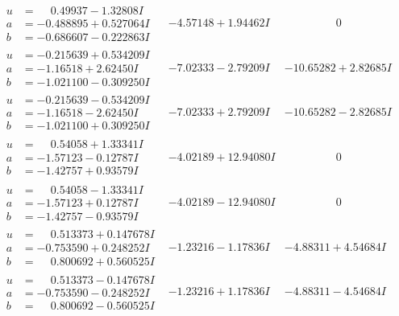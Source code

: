 \documentclass[1p]{elsarticle_modified}
\theoremstyle{definition}
\begin{document}
$$\begin{array}{c|c|c}
\begin{aligned}
u &= \phantom{-}0.49937 - 1.32808 I \\
a &= -0.488895 + 0.527064 I \\
b &= -0.686607 - 0.222863 I\end{aligned}
 & -4.57148 + 1.94462 I & \phantom{-0.000000 } 0 \\ \hline\begin{aligned}
u &= -0.215639 + 0.534209 I \\
a &= -1.16518 + 2.62450 I \\
b &= -1.021100 - 0.309250 I\end{aligned}
 & -7.02333 - 2.79209 I & -10.65282 + 2.82685 I \\ \hline\begin{aligned}
u &= -0.215639 - 0.534209 I \\
a &= -1.16518 - 2.62450 I \\
b &= -1.021100 + 0.309250 I\end{aligned}
 & -7.02333 + 2.79209 I & -10.65282 - 2.82685 I \\ \hline\begin{aligned}
u &= \phantom{-}0.54058 + 1.33341 I \\
a &= -1.57123 - 0.12787 I \\
b &= -1.42757 + 0.93579 I\end{aligned}
 & -4.02189 + 12.94080 I & \phantom{-0.000000 } 0 \\ \hline\begin{aligned}
u &= \phantom{-}0.54058 - 1.33341 I \\
a &= -1.57123 + 0.12787 I \\
b &= -1.42757 - 0.93579 I\end{aligned}
 & -4.02189 - 12.94080 I & \phantom{-0.000000 } 0 \\ \hline\begin{aligned}
u &= \phantom{-}0.513373 + 0.147678 I \\
a &= -0.753590 + 0.248252 I \\
b &= \phantom{-}0.800692 + 0.560525 I\end{aligned}
 & -1.23216 - 1.17836 I & -4.88311 + 4.54684 I \\ \hline\begin{aligned}
u &= \phantom{-}0.513373 - 0.147678 I \\
a &= -0.753590 - 0.248252 I \\
b &= \phantom{-}0.800692 - 0.560525 I\end{aligned}
 & -1.23216 + 1.17836 I & -4.88311 - 4.54684 I\\

\end{array}$$
\end{document}
